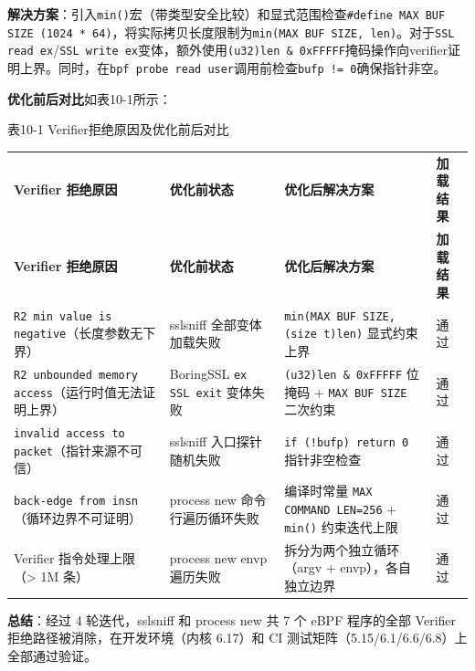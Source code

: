 \documentclass[a4paper]{ctexart}
\makeatletter
\renewcommand{\_}{%
  \ifmmode
    \nfss@text{\textunderscore}%
  \else
    \textunderscore\discretionary{}{}{}%
  \fi}
\makeatother
\begin{document}
\textbf{解决方案}：引入\texttt{min()}宏（带类型安全比较）和显式范围检查\texttt{\#define MAX\_BUF\_SIZE (1024 * 64)}，将实际拷贝长度限制为\texttt{min(MAX\_BUF\_SIZE, len)}。对于\texttt{SSL\_read\_ex}/\texttt{SSL\_write\_ex}变体，额外使用\texttt{(u32)len \& 0xFFFFF}掩码操作向verifier证明上界。同时，在\texttt{bpf\_probe\_read\_user}调用前检查\texttt{bufp != 0}确保指针非空。


\textbf{优化前后对比}如表10-1所示：




\medskip
{\centering\small
表10-1 Verifier拒绝原因及优化前后对比\par
\vspace{3pt}
\setlength{\tabcolsep}{6pt}
\renewcommand{\arraystretch}{1.1}
\begin{longtable}{>{\raggedright\arraybackslash}p{3.3cm} >{\raggedright\arraybackslash}p{3.3cm} >{\raggedright\arraybackslash}p{3.3cm} >{\raggedright\arraybackslash}p{3.3cm}}
\hline
\textbf{Verifier 拒绝原因} & \textbf{优化前状态} & \textbf{优化后解决方案} & \textbf{加载结果} \\*
\hline
\endfirsthead
\hline
\textbf{Verifier 拒绝原因} & \textbf{优化前状态} & \textbf{优化后解决方案} & \textbf{加载结果} \\
\hline
\endhead
\hline
\endfoot
\hline
\endlastfoot
\texttt{R2 min value is negative}（长度参数无下界） & sslsniff 全部变体加载失败 & \texttt{min(MAX\_BUF\_SIZE, (size\_t)len)} 显式约束上界 & 通过 \\*
\hline
\texttt{R2 unbounded memory access}（运行时值无法证明上界） & BoringSSL \texttt{ex\_SSL\_exit} 变体失败 & \texttt{(u32)len \& 0xFFFFF} 位掩码 + \texttt{MAX\_BUF\_SIZE} 二次约束 & 通过 \\
\hline
\texttt{invalid access to packet}（指针来源不可信） & sslsniff 入口探针随机失败 & \texttt{if (!bufp) return 0} 指针非空检查 & 通过 \\
\hline
\texttt{back-edge from insn}（循环边界不可证明） & process\_new 命令行遍历循环失败 & 编译时常量 \texttt{MAX\_COMMAND\_LEN=256} + \texttt{min()} 约束迭代上限 & 通过 \\
\hline
Verifier 指令处理上限（> 1M 条） & process\_new envp 遍历失败 & 拆分为两个独立循环（argv + envp），各自独立边界 & 通过 \\
\hline
\end{longtable}
\par}



\textbf{总结}：经过 4 轮迭代，sslsniff 和 process\_new 共 7 个 eBPF 程序的全部 Verifier 拒绝路径被消除，在开发环境（内核 6.17）和 CI 测试矩阵（5.15/6.1/6.6/6.8）上全部通过验证。
\end{document}
